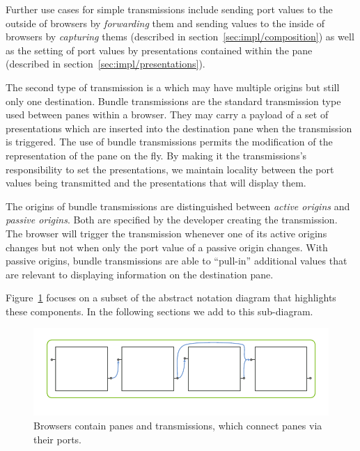 \documentclass[a4paper,10pt,twoside]{book}
\begin{document}
Further use cases for simple transmissions include sending port values to the outside of browsers by \emph{forwarding} them and sending values to the inside of browsers by \emph{capturing} thems (described in section~\ref{sec:impl/composition}) as well as the setting of port values by presentations contained within the pane (described in section~\ref{sec:impl/presentations}).

The second type of transmission is a  which may have multiple origins but still only one destination. Bundle transmissions are the standard transmission type used between panes within a browser. They may carry a payload of a set of presentations which are inserted into the destination pane when the transmission is triggered. The use of bundle transmissions permits the modification of the representation of the pane on the fly. By making it the transmissions's responsibility to set the presentations, we maintain locality between the port values being transmitted and the presentations that will display them.

The origins of bundle transmissions are distinguished between
\emph{active origins} and \emph{passive origins}. Both are specified
by the developer creating the transmission. The browser will trigger
the transmission whenever one of its active origins changes but not
when only the port value of a passive origin changes. With passive
origins, bundle transmissions are able to ``pull-in'' additional values
that are relevant to displaying information on the destination pane.

Figure~\ref{fig:abs-browser} focuses on a subset of the abstract notation diagram that highlights these components. In the following sections we add to this sub-diagram.

\begin{figure}[htbp]
\centerline{\includegraphics[width=\linewidth]{browser.pdf}}
\caption{Browsers contain panes and transmissions, which connect panes via their ports.}
\label{fig:abs-browser}
\end{figure}
\end{document}
